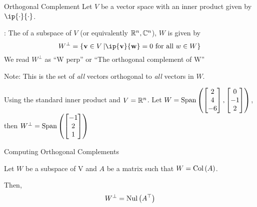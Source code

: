 \documentclass[xcoler=dvipsnames, aspectratio=169]{beamer}
\date{Orthogonality}
\newcommand{\C}{\mathbb{C}}
\begin{document}
    \begin{frame}{Orthogonal Complement}
        \footnotesize
        Let $V$ be a vector space with an inner product given by $\ip{\cdot}{\cdot}$.
        \begin{defn}
            : The  of a subspace of 
            $V$ (or equivalently $\R^n,\C^n$), $W$ is given by
            \[
                W^\perp = \set{\vec{v}\in V}{\ip{\vec{v}}{\vec{w}} = 0\textnormal{ for all }w\in W}
            \]\pause
            We read $W^\perp$ as ``W perp'' or ``The orthogonal complement of W''
        \end{defn}\pause
        Note: This is the set of \emph{all} vectors orthogonal to \emph{all} vectors in $W$.
        \begin{example}Using the standard inner product and $V=\mathbb{R}^n$.
        Let $W=\text{Span}\left(\begin{bmatrix}2\\4\\-6\end{bmatrix},\begin{bmatrix}0\\-1\\2\end{bmatrix}\right)$, then $W^\perp=\text{Span}\left(\begin{bmatrix}-1\\2\\1\end{bmatrix}\right)$
        \end{example}
    \end{frame}
    \begin{frame}{Computing Orthogonal Complements}
        \begin{theorem}
            Let $W$ be a subspace of V and $A$ be a matrix such that $W = \mathrm{Col}\left(A\right)$.

            Then, $$W^\perp = \mathrm{Nul}\left(A^\top\right)$$
        \end{theorem}
    \end{frame}
\end{document}

